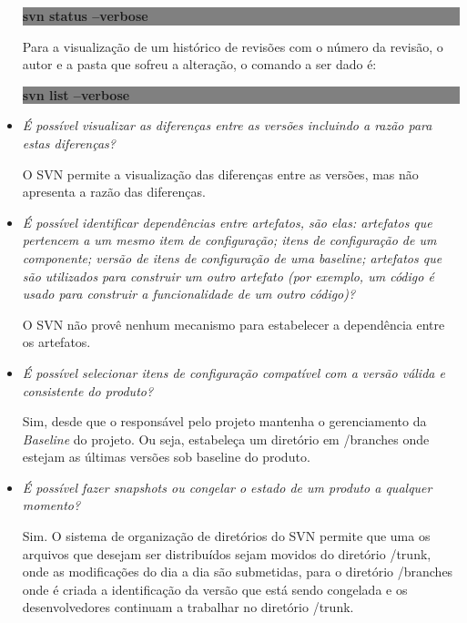 \begin{itemize}
    \begin{centering}
    \colorbox{Gray}{
    \begin{minipage}{120px}
      \textbf{svn status --verbose}
    \end{minipage}
    }

    \end{centering}

    Para a visualização de um histórico de revisões com o número da revisão, o autor e a pasta que sofreu a alteração, o comando a ser dado é:

     \begin{centering}
    \colorbox{Gray}{
    \begin{minipage}{120px}
      \textbf{svn list --verbose}
    \end{minipage}
    }

    \end{centering}

  \item \textit{É possível visualizar as diferenças entre as versões incluindo a razão para estas
  diferenças?}

      O SVN permite a visualização das diferenças entre as versões, mas não apresenta a razão das diferenças.

  \item \textit{É possível identificar dependências entre artefatos, são elas: artefatos que pertencem a um mesmo item de configuração; itens de configuração de um componente; versão de itens de configuração de uma baseline; artefatos que são utilizados para construir um outro artefato  (por exemplo, um código é usado para construir a funcionalidade de um outro código)?}
      
      O SVN não provê nenhum mecanismo para estabelecer a dependência entre os artefatos.
      
  \item \textit{É possível selecionar itens de configuração compatível com a versão válida e consistente do
  produto?}

      Sim, desde que o responsável pelo projeto mantenha o gerenciamento da \textit{Baseline} do projeto. Ou seja, estabeleça um diretório em /branches onde estejam as últimas versões sob baseline do produto.

  \item \textit{É possível fazer snapshots ou congelar o estado de um produto a qualquer momento?}

      Sim. O sistema de organização de diretórios do SVN permite que uma os arquivos que desejam ser distribuídos sejam movidos do diretório /trunk, onde as modificações do dia a dia são submetidas, para  o diretório /branches onde é criada a identificação da versão que está sendo congelada e os desenvolvedores continuam a trabalhar no diretório /trunk.


\end{itemize}
